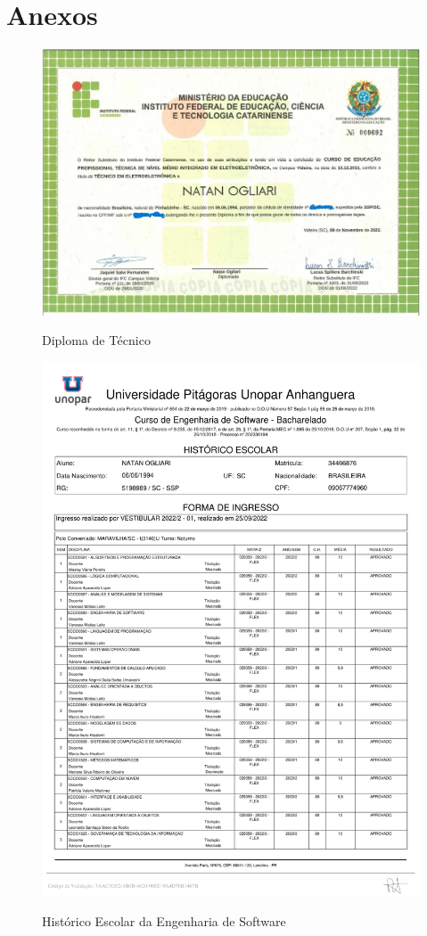 

\section{Anexos}
\begin{figure}[H]
        \centering
        \caption{Diploma de Técnico}
        \includegraphics[width=1\textwidth]{figure/Doc/Diploma frente.jpg}
        \label{fig:diploma}
\end{figure}

\begin{figure}[H]
        \centering
        \caption{Histórico Escolar da Engenharia de Software}
        \includegraphics[width=1\textwidth]{figure/Doc/historico_2025-1.pdf}
        \label{fig:historico}
\end{figure}
